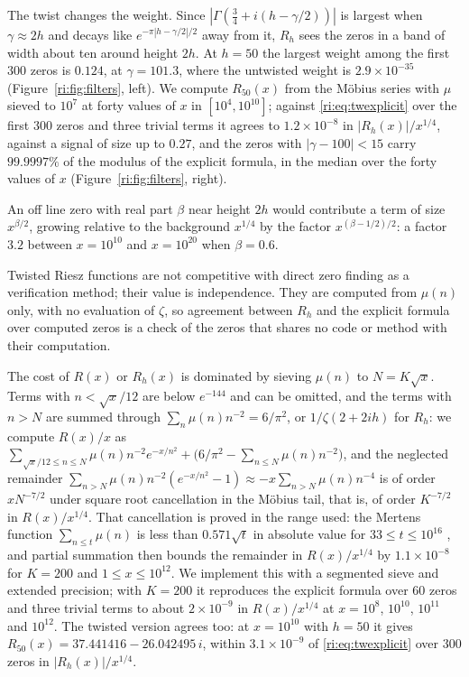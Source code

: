 The twist changes the weight. Since $|\Gamma(\frac34+i(h-\gamma/2))|$ is largest when $\gamma\approx2h$ and decays like $e^{-\pi|h-\gamma/2|/2}$ away from it, $R_h$ sees the zeros in a band of width about ten around height $2h$. At $h=50$ the largest weight among the first $300$ zeros is $0.124$, at $\gamma=101.3$, where the untwisted weight is $2.9\times10^{-35}$ (Figure~\ref{ri:fig:filters}, left). We compute $R_{50}(x)$ from the M\"obius series with $\mu$ sieved to $10^7$ at forty values of $x$ in $[10^4,10^{10}]$; against \eqref{ri:eq:twexplicit} over the first $300$ zeros and three trivial terms it agrees to $1.2\times10^{-8}$ in $|R_h(x)|/x^{1/4}$, against a signal of size up to $0.27$, and the zeros with $|\gamma-100|<15$ carry $99.9997\%$ of the modulus of the explicit formula, in the median over the forty values of $x$ (Figure~\ref{ri:fig:filters}, right).

An off line zero with real part $\beta$ near height $2h$ would contribute a term of size $x^{\beta/2}$, growing relative to the background $x^{1/4}$ by the factor $x^{(\beta-1/2)/2}$: a factor $3.2$ between $x=10^{10}$ and $x=10^{20}$ when $\beta=0.6$.

\begin{remark}\label{ri:rem:indep}
Twisted Riesz functions are not competitive with direct zero finding as a verification method; their value is independence. They are computed from $\mu(n)$ only, with no evaluation of $\zeta$, so agreement between $R_h$ and the explicit formula over computed zeros is a check of the zeros that shares no code or method with their computation.
\end{remark}

The cost of $R(x)$ or $R_h(x)$ is dominated by sieving $\mu(n)$ to $N=K\sqrt x$. Terms with $n<\sqrt x/12$ are below $e^{-144}$ and can be omitted, and the terms with $n>N$ are summed through $\sum_n\mu(n)n^{-2}=6/\pi^2$, or $1/\zeta(2+2ih)$ for $R_h$: we compute $R(x)/x$ as $\sum_{\sqrt x/12\le n\le N}\mu(n)n^{-2}e^{-x/n^2}+\big(6/\pi^2-\sum_{n\le N}\mu(n)n^{-2}\big)$, and the neglected remainder $\sum_{n>N}\mu(n)n^{-2}(e^{-x/n^2}-1)\approx-x\sum_{n>N}\mu(n)n^{-4}$ is of order $xN^{-7/2}$ under square root cancellation in the M\"obius tail, that is, of order $K^{-7/2}$ in $R(x)/x^{1/4}$. That cancellation is proved in the range used: the Mertens function $\sum_{n\le t}\mu(n)$ is less than $0.571\sqrt t$ in absolute value for $33\le t\le10^{16}$ \cite[Section 6.1]{Hurst18}, and partial summation then bounds the remainder in $R(x)/x^{1/4}$ by $1.1\times10^{-8}$ for $K=200$ and $1\le x\le10^{12}$. We implement this with a segmented sieve and extended precision; with $K=200$ it reproduces the explicit formula over $60$ zeros and three trivial terms to about $2\times10^{-9}$ in $R(x)/x^{1/4}$ at $x=10^8$, $10^{10}$, $10^{11}$ and $10^{12}$. The twisted version agrees too: at $x=10^{10}$ with $h=50$ it gives $R_{50}(x)=37.441416-26.042495\,i$, within $3.1\times10^{-9}$ of \eqref{ri:eq:twexplicit} over $300$ zeros in $|R_h(x)|/x^{1/4}$.

